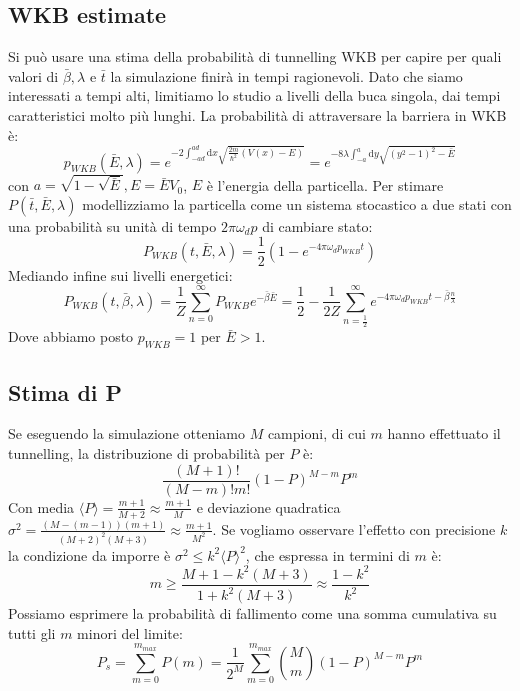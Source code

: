 \documentclass[italian]{article}
\newcommand{\dx}{\mathrm{d}x}
\newcommand{\dy}{\mathrm{d}y}
\begin{document}
	\subsection{WKB estimate}
	Si può usare una stima della probabilità di tunnelling WKB per capire per quali valori di $\bar{\beta}, \lambda$ e $\bar{t}$ la simulazione finirà in tempi ragionevoli.
	Dato che siamo interessati a tempi alti, limitiamo lo studio a livelli della buca singola, dai tempi caratteristici molto più lunghi.
	La probabilità di attraversare la barriera in WKB è:
	\begin{equation}
		p_{WKB}(\bar{E},\lambda)=e^{-2\int_{-ad}^{ad}\dx \sqrt{\frac{2m}{\hbar^2}(V(x)-E)}} =
		e^{-8\lambda\int_{-a}^{a} \dy \sqrt{\left(y^2 -1\right)^2 -\bar{E}}}
	\end{equation}
	con $a = \sqrt{1-\sqrt{\bar{E}}}, E = \bar{E}V_0$, $E$ è l'energia della particella. Per stimare $P(\bar{t},\bar{E}, \lambda)$ modellizziamo la particella come un sistema stocastico a due stati con una probabilità su unità di tempo $2\pi\omega_d p$ di cambiare stato:
	\begin{equation}
		P_{WKB}(t, \bar{E}, \lambda) = \frac{1}{2} \left(1-e^{-4\pi\omega_d p_{WKB} t}\right)
	\end{equation}
	Mediando infine sui livelli energetici:
	\begin{equation}
		P_{WKB}(t, \bar{\beta}, \lambda) = \frac{1}{Z} \sum_{n=0}^{\infty} P_{WKB} e^{-\bar{\beta}\bar{E}} =
		\frac{1}{2} - \frac{1}{2Z} \sum_{n=\frac{1}{2}}^{\infty}  e^{-4\pi\omega_d p_{WKB} t-\bar{\beta}\frac{n}{\lambda}}
	\end{equation}
	Dove abbiamo posto $p_{WKB} = 1$ per $\bar{E} > 1$.
	\subsection{Stima di P}
	Se eseguendo la simulazione otteniamo $M$ campioni, di cui $m$ hanno effettuato il tunnelling, la distribuzione di probabilità per $P$ è:
	\begin{equation}
		\frac{\left(M+1\right)!}{\left(M-m\right)!m!}(1-P)^{M-m}P^{m}
	\end{equation}
	Con media $\langle P\rangle=\frac{m+1}{M+2} \approx \frac{m+1}{M}$ e deviazione quadratica $\sigma^2 =\frac{\left(M-\left(m-1\right)\right)\left(m+1\right)}{\left(M+2\right)^{2}\left(M+3\right)} \approx \frac{m+1}{M^2}$. Se vogliamo osservare l'effetto con precisione $k$ la condizione da imporre è $\sigma^2 \le k^2 \langle P\rangle^2 $, che espressa in termini di $m$ è:
	\begin{equation*}
		m \ge \frac{M+1 - k^2(M+3)}{1 + k^2(M+3)} \approx \frac{1-k^2}{k^2}
	\end{equation*}
	Possiamo esprimere la probabilità di fallimento come una somma cumulativa su tutti gli $m$ minori del limite:
	\begin{equation}
		P_s =  \sum_{m=0}^{m_{max}} P(m) = \frac{1}{2^M} \sum_{m=0}^{m_{max}} {M\choose m}(1-P)^{M-m}P^m
	\end{equation}
\end{document}

